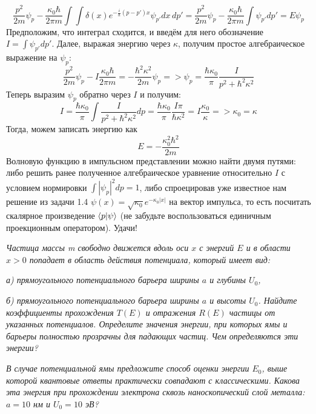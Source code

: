 \[
\frac{p^2}{2m}\psi_p - \frac{\kappa_0\hbar}{2\pi m}\int\int \delta(x) e^{-\frac{i}{h}(p-p')x}\psi_{p'} dx\,dp'= \frac{p^2}{2m}\psi_p - \frac{\kappa_0\hbar}{2\pi m}\int\psi_{p'} dp' =  E\psi_p
\]
Предположим, что интеграл сходится, и введём для него обозначение $I = \int \psi_{p'}dp'$. Далее, выражая энергию через $\kappa$, получим простое алгебраическое выражение на $\psi_p$:
\[
\frac{p^2}{2m}\psi_p - I\frac{\kappa_0\hbar}{2\pi m} = -\frac{\hbar^2\kappa^2}{2m}\psi_p => \psi_p = \frac{\hbar\kappa_0}{\pi}\frac{I}{p^2 + \hbar^2\kappa^2}
\]
Теперь выразим $\psi_p$ обратно через $I$ и получим:
\[
I = \frac{\hbar\kappa_0}{\pi}\int\frac{I}{p^2 + \hbar^2\kappa^2}dp = \frac{\hbar \kappa_0}{\pi}\frac{I \pi}{\hbar\kappa^2} = I\frac{\kappa_0}{\kappa} => \kappa_0 = \kappa
\]
Тогда, можем записать энергию как 
\[
E = -\frac{\kappa^2_0\hbar^2}{2m}
\]
Волновую функцию в импульсном представлении можно найти двумя путями: либо решить ранее полученное алгебраическое уравнение относительно $I$ с условием нормировки $\int|\psi_p|^2dp = 1$, либо спроецировав уже известное нам решение из задачи 1.4 $\psi(x) =\sqrt{\kappa_0}e^{-\kappa_0|x|}$ на вектор импульса, то есть посчитать скалярное произведение $\bra{p}\ket{\psi}$ (не забудьте воспользоваться единичным проекционным оператором). Удачи!

\begin{center}
    \textit{Частица массы m свободно движется вдоль оси $x$ с энергий $E$ и в области $x>0$ попадает в область действия потенциала, который имеет вид:}
    
    \textit{а) прямоугольного потенциального барьера ширины $a$ и глубины $U_0$,}

    \textit{б) прямоугольного потенциального барьера ширины $a$ и высоты $U_0$. Найдите коэффициенты прохождения $T(E)$ и отражения $R(E)$ частицы от указанных потенциалов. Определите значения энергии, при которых ямы и барьеры полностью прозрачны для падающих частиц. Чем определяются эти энергии?}

    \textit{В случае потенциальной ямы предложите способ оценки энергии $E_0$, выше которой квантовые ответы практически совпадают с классическими. Какова эта энергия при прохождении электрона сквозь наноскопический слой металла: $a=10$ нм и $U_0 = 10$ эВ?}
\end{center}

